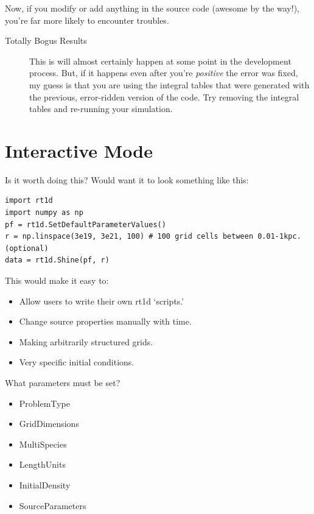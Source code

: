 \documentclass[letterpaper,titlepage,12pt]{article}
\numberwithin{equation}{section}
\begin{document}
Now, if you modify or add anything in the source code (awesome by the way!), you're far more likely to encounter troubles.


\begin{description}
    \item[Totally Bogus Results] This is will almost certainly happen at some point in the development process. But, if it happens even after you're \textit{positive} the error was fixed, my guess is that you are using the integral tables that were generated with the previous, error-ridden version of the code.  Try removing the integral tables and re-running your simulation.
\end{description}

\section{Interactive Mode}
Is it worth doing this?  Would want it to look something like this:

\begin{verbatim}
import rt1d
import numpy as np
pf = rt1d.SetDefaultParameterValues()
r = np.linspace(3e19, 3e21, 100) # 100 grid cells between 0.01-1kpc. (optional)
data = rt1d.Shine(pf, r)    
\end{verbatim}    

This would make it easy to:
\begin{itemize}
    \item Allow users to write their own rt1d `scripts.'
    \item Change source properties manually with time.
    \item Making arbitrarily structured grids.
    \item Very specific initial conditions.
\end{itemize}    

What parameters must be set?
\begin{itemize}
    \item ProblemType
    \item GridDimensions
    \item MultiSpecies
    \item LengthUnits
    \item InitialDensity
    \item SourceParameters
\end{itemize}

\newpage


\end{document}

